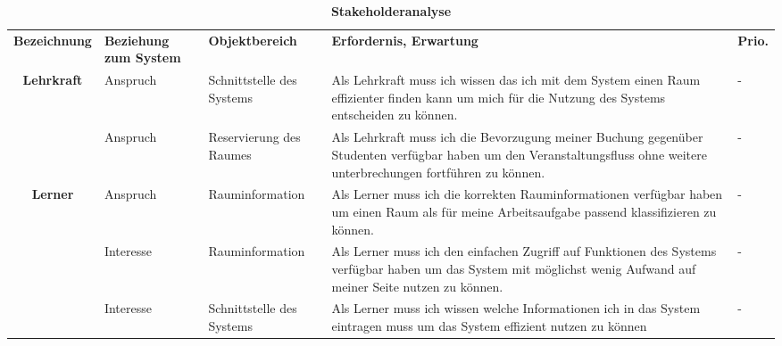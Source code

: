 \begin{table}[h]
	
 	\caption{\textbf{Stakeholderanalyse}}
 	\begin{tabularx}{\textwidth}{|c|X|X|X|m{}|}			
 		\rowcolor{heading}\textbf{Bezeichnung} & \textbf{Beziehung zum System} & \textbf{Objektbereich} & \textbf{Erfordernis, Erwartung} & \textbf{Prio.}\\
			 
\rowcolor{odd} \textbf{Lehrkraft} & Anspruch & Schnittstelle des Systems & 	Als Lehrkraft muss ich wissen das ich mit dem System einen Raum effizienter finden kann um mich für die Nutzung des Systems entscheiden zu können. & -\\
		 & Anspruch & Reservierung des Raumes & Als Lehrkraft muss ich die Bevorzugung meiner Buchung gegenüber Studenten verfügbar haben um den Veranstaltungsfluss ohne weitere unterbrechungen fortführen zu können. & -\\ \hline

\rowcolor{odd} \textbf{Lerner} & Anspruch & Rauminformation & 	Als Lerner muss ich die korrekten Rauminformationen verfügbar haben um einen Raum als für meine Arbeitsaufgabe passend klassifizieren zu können. & -\\
		 & Interesse & Rauminformation & Als Lerner muss ich den einfachen Zugriff auf Funktionen des Systems verfügbar haben um das System mit möglichst wenig Aufwand auf meiner Seite nutzen zu können. & -\\
\rowcolor{odd} & Interesse & Schnittstelle des Systems & Als Lerner muss ich wissen welche Informationen ich in das System eintragen muss um das System effizient nutzen zu können & -\\ \hline
 	\end{tabularx}
 	
\end{table}

